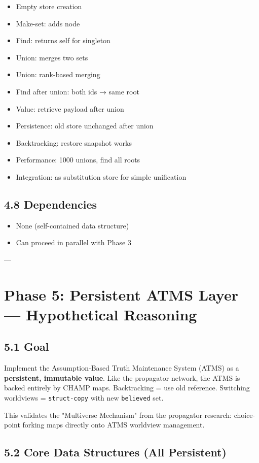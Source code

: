 \documentclass[11pt]{article}
\begin{document}
\begin{itemize}
\item Empty store creation
\item Make-set: adds node
\item Find: returns self for singleton
\item Union: merges two sets
\item Union: rank-based merging
\item Find after union: both ids → same root
\item Value: retrieve payload after union
\item Persistence: old store unchanged after union
\item Backtracking: restore snapshot works
\item Performance: 1000 unions, find all roots
\item Integration: as substitution store for simple unification
\end{itemize}
\subsection{4.8 Dependencies}
\label{sec:org4261823}

\begin{itemize}
\item None (self-contained data structure)
\item Can proceed in parallel with Phase 3
\end{itemize}

---
\section{Phase 5: Persistent ATMS Layer — Hypothetical Reasoning}
\label{sec:orga1238b3}

\subsection{5.1 Goal}
\label{sec:org2f33d1b}

Implement the Assumption-Based Truth Maintenance System (ATMS) as a
\textbf{persistent, immutable value}. Like the propagator network, the ATMS is
backed entirely by CHAMP maps. Backtracking = use old reference.
Switching worldviews = \texttt{struct-copy} with new \texttt{believed} set.

This validates the "Multiverse Mechanism" from the propagator research:
choice-point forking maps directly onto ATMS worldview management.
\subsection{5.2 Core Data Structures (All Persistent)}
\label{sec:orgf331d16}
\end{document}
